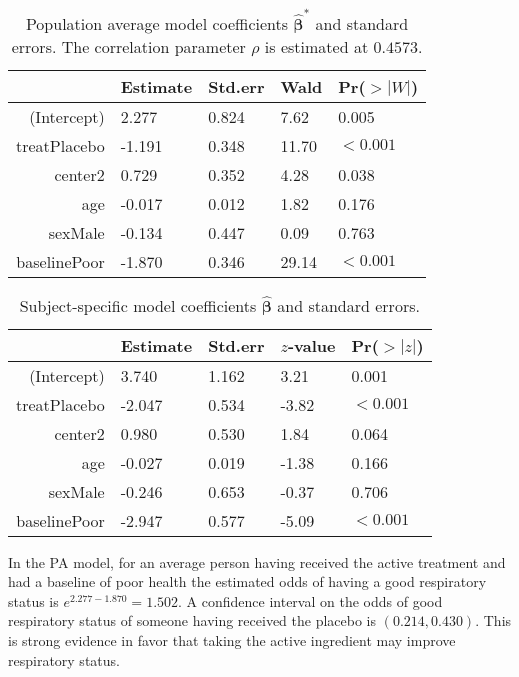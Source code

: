 \documentclass[12pt]{article}
\newcommand{\m}[1]{\mathbf{\bm{#1}}}
\begin{document}
\begin{table}[h]
\begin{center}
\begin{tabular}{r | llll}
 & \multicolumn{1}{r}{Estimate} & \multicolumn{1}{r}{Std.err} &
    \multicolumn{1}{r}{Wald} & \multicolumn{1}{r}{Pr($>|W|$)} \\ \hline \hline
(Intercept)  &  2.277 & 0.824 &  7.62 & 0.005 \\
treatPlacebo & -1.191 & 0.348 & 11.70 & $<0.001$ \\
center2      &  0.729 & 0.352 &  4.28 & 0.038 \\
age          & -0.017 & 0.012 &  1.82 & 0.176 \\
sexMale      & -0.134 & 0.447 &  0.09 & 0.763 \\
baselinePoor & -1.870 & 0.346 & 29.14 & $<0.001$ \\
\end{tabular}
\end{center}
\caption{Population average model coefficients $\hat{\m{\beta}}^*$ and standard errors. The correlation parameter $\rho$ is estimated at $0.4573$.}
\label{pa_coef}
\end{table}

\begin{table}[h]
\begin{center}
\begin{tabular}{r | llll}
 & \multicolumn{1}{r}{Estimate} & \multicolumn{1}{r}{Std.err} &
    \multicolumn{1}{r}{$z$-value} & \multicolumn{1}{r}{Pr($>|z|$)} \\ \hline \hline
(Intercept)  &  3.740 & 1.162 &  3.21 & 0.001 \\
treatPlacebo & -2.047 & 0.534 & -3.82 & $<0.001$ \\
center2      &  0.980 & 0.530 &  1.84 & 0.064 \\
age          & -0.027 & 0.019 & -1.38 & 0.166 \\
sexMale      & -0.246 & 0.653 & -0.37 & 0.706 \\
baselinePoor & -2.947 & 0.577 & -5.09 & $<0.001$ \\
\end{tabular}
\end{center}
\caption{Subject-specific model coefficients $\hat{\m{\beta}}$ and standard errors.}
\label{ss_coef}
\end{table}

\noindent In the PA model, for an average person having received the active treatment and had a baseline of poor health the estimated odds of having a good respiratory status is $e^{2.277-1.870} = 1.502$. A confidence interval on the odds of good respiratory status of someone having received the placebo is $(0.214, 0.430)$. This is strong evidence in favor that taking the active ingredient may improve respiratory status.
\bigskip
\end{document}
